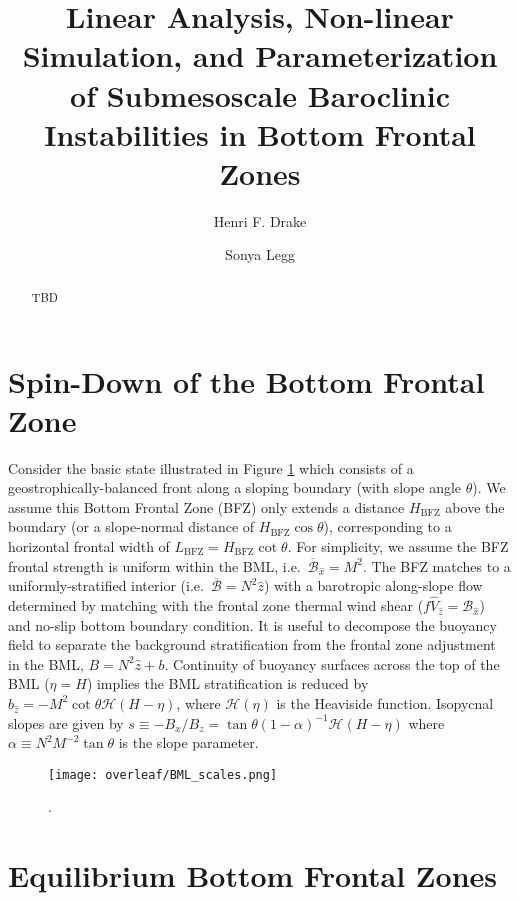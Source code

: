 \documentclass{article}
\title{Linear Analysis, Non-linear Simulation, and Parameterization of Submesoscale Baroclinic Instabilities in Bottom Frontal Zones}
\author[1,c]{Henri F. Drake}
\author[1]{Sonya Legg}
\affil[1]{Princeton University, Princeton, NJ, USA}
\affil[c]{\normalfont{Corresponding author: henrifdrake@gmail.com}}
\date{}             %
\newcommand{\detailtexcount}[1]{%
  \immediate\write18{texcount -merge -sum -q #1.tex output.bbl > #1.wcdetail }%
}
\newcommand{\quickwordcount}[1]{%
  \immediate\write18{texcount -1 -sum -merge -q #1.tex output.bbl > #1-words.sum }%
   words%
}
\newcommand{\quickcharcount}[1]{%
  \immediate\write18{texcount -1 -sum -merge -char -q #1.tex output.bbl > #1-chars.sum }%
   characters (not including spaces)%
}
\begin{document}
\maketitle

\linenumbers
\begin{abstract}
    TBD
\end{abstract}


\section{Spin-Down of the Bottom Frontal Zone}

Consider the basic state illustrated in Figure \ref{fig:BML-scales} which consists of a geostrophically-balanced front along a sloping boundary (with slope angle $\theta$). We assume this Bottom Frontal Zone (BFZ) only extends a distance $H_{\text{BFZ}}$ above the boundary (or a slope-normal distance of $H_{\text{BFZ}} \cos{\theta}$), corresponding to a horizontal frontal width of $L_{\text{BFZ}} = H_{\text{BFZ}} \cot{\theta}$. For simplicity, we assume the BFZ frontal strength is uniform within the BML, i.e.~$\overline{\mathcal{B}}_{\hat{x}} = M^{2}$. The BFZ matches to a uniformly-stratified interior (i.e.~$\overline{\mathcal{B}} = N^{2}\hat{z}$) with a barotropic along-slope flow determined by matching with the frontal zone thermal wind shear ($f \hat{V}_{\hat{z}} = \mathcal{B}_{\hat{x}}$) and no-slip bottom boundary condition. It is useful to decompose the buoyancy field to separate the background stratification from the frontal zone adjustment in the BML, $B = N^{2}\hat{z} + b$. Continuity of buoyancy surfaces across the top of the BML ($\eta=H$) implies the BML stratification is reduced by $b_{\hat{z}} = -M^{2} \cot{\theta} \mathcal{H}(H-\eta)$, where $\mathcal{H}(\eta)$ is the Heaviside function. Isopycnal slopes are given by $s \equiv -B_{x}/B_{z} = \tan{\theta} (1 - \alpha)^{-1}\mathcal{H}(H-\eta)$ where $\alpha \equiv N^{2} M^{-2} \tan{\theta}$ is the slope parameter.


\begin{figure}[htb!]
\noindent\texttt{[image: overleaf/BML\_scales.png]}
\centering
\caption{.}
\label{fig:BML-scales}
\end{figure}

\section{Equilibrium Bottom Frontal Zones}
\end{document}
